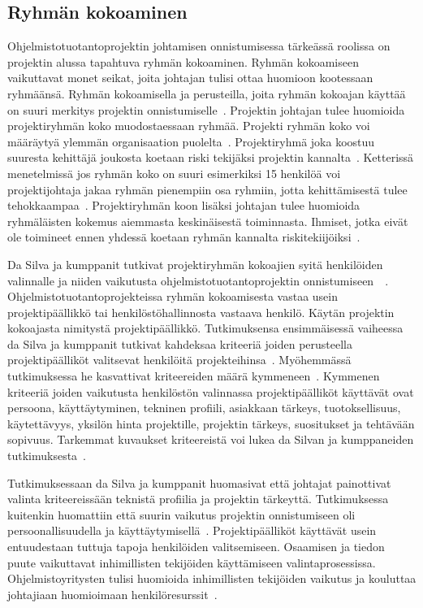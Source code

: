 \documentclass[finnish]{tktltiki2}
\theoremstyle{definition}
\theoremstyle{remark}
\begin{document}
\subsection{Ryhmän kokoaminen}


Ohjelmistotuotantoprojektin johtamisen onnistumisessa tärkeässä roolissa on projektin alussa tapahtuva ryhmän kokoaminen. Ryhmän kokoamiseen vaikuttavat monet seikat, joita johtajan tulisi ottaa huomioon kootessaan ryhmäänsä. Ryhmän kokoamisella ja perusteilla, joita ryhmän kokoajan käyttää on suuri merkitys projektin onnistumiselle~\cite{daSilva2012}. Projektin johtajan tulee huomioida projektiryhmän koko muodostaessaan ryhmää. Projekti ryhmän koko voi määräytyä ylemmän organisaation puolelta~\cite{McLeod:2011:FAS:1978802.1978803}. Projektiryhmä joka koostuu suuresta kehittäjä joukosta koetaan riski tekijäksi projektin kannalta~\cite{McLeod:2011:FAS:1978802.1978803}. Ketterissä menetelmissä jos ryhmän koko on suuri esimerkiksi 15 henkilöä voi projektijohtaja jakaa ryhmän pienempiin osa ryhmiin, jotta kehittämisestä tulee tehokkaampaa~\cite{Augustine:2005:APM:1101779.1101781}. Projektiryhmän koon lisäksi johtajan tulee huomioida ryhmäläisten kokemus aiemmasta keskinäisestä toiminnasta. Ihmiset, jotka eivät ole toimineet ennen yhdessä koetaan ryhmän kannalta riskitekiijöiksi~\cite{McLeod:2011:FAS:1978802.1978803}.

Da Silva ja kumppanit tutkivat projektiryhmän kokoajien syitä henkilöiden valinnalle ja niiden vaikutusta ohjelmistotuotantoprojektin onnistumiseen~\cite{daSilva2012}~\cite{francca2009quantitative}. Ohjelmistotuotantoprojekteissa ryhmän kokoamisesta vastaa usein projektipäällikkö tai henkilöstöhallinnosta vastaava henkilö. Käytän projektin kokoajasta nimitystä projektipäällikkö. Tutkimuksensa ensimmäisessä vaiheessa da Silva ja kumppanit tutkivat kahdeksaa kriteeriä joiden perusteella projektipäälliköt valitsevat henkilöitä projekteihinsa~\cite{francca2009quantitative}. Myöhemmässä tutkimuksessa he kasvattivat kriteereiden määrä kymmeneen~\cite{daSilva2012}. Kymmenen kriteeriä joiden vaikutusta henkilöstön valinnassa projektipäälliköt käyttävät ovat persoona, käyttäytyminen, tekninen profiili, asiakkaan tärkeys, tuotoksellisuus, käytettävyys, yksilön hinta projektille, projektin tärkeys, suositukset ja tehtävään sopivuus. Tarkemmat kuvaukset kriteereistä voi lukea da Silvan ja kumppaneiden tutkimuksesta~\cite{daSilva2012}.

Tutkimuksessaan da Silva ja kumppanit huomasivat että johtajat painottivat valinta kriteereissään teknistä profiilia ja projektin tärkeyttä. Tutkimuksessa kuitenkin huomattiin että suurin vaikutus projektin onnistumiseen oli persoonallisuudella ja käyttäytymisellä~\cite{daSilva2012}. Projektipäälliköt käyttävät usein entuudestaan tuttuja tapoja henkilöiden valitsemiseen. Osaamisen ja tiedon puute vaikuttavat inhimillisten tekijöiden käyttämiseen valintaprosessissa. Ohjelmistoyritysten tulisi huomioida inhimillisten tekijöiden vaikutus ja kouluttaa johtajiaan huomioimaan henkilöresurssit~\cite{daSilva2012}.
\end{document}
